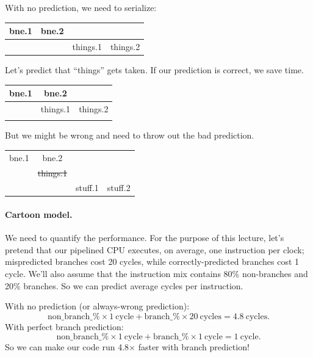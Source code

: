 \documentclass[a4paper]{report}
\begin{document}
With no prediction, we need to serialize:

\begin{center}
\begin{tabular}{c|c|c|c}
bne.1 & bne.2 \\ \hline
& & things.1 & things.2
\end{tabular}
\end{center}

\begin{minipage}{.49\textwidth}
Let's predict that ``things'' gets taken.
If our prediction is correct, we save time.

\begin{center}
\begin{tabular}{c|c|c}
bne.1 & bne.2 \\ \hline
& things.1 & things.2 \\
\\
\end{tabular}
\end{center}
\end{minipage} \hspace*{.02\textwidth} \begin{minipage}{.49\textwidth}
But we might be wrong and need to throw out the bad prediction.

\begin{center}
\begin{tabular}{c|c|c|c}
bne.1 & bne.2 \\ \cline{1-2}
& \sout{things.1} \\ \hline
& & stuff.1 & stuff.2
\end{tabular}
\end{center}
\end{minipage}

\paragraph{Cartoon model.} We need to quantify the performance.
For the purpose of this lecture, let's pretend that our pipelined
CPU executes, on average, one instruction per clock;
mispredicted branches cost 20 cycles, while correctly-predicted
branches cost 1 cycle. We'll also assume that the instruction
mix contains 80\% non-branches and 20\% branches. So we can predict
average cycles per instruction.

With no prediction (or always-wrong prediction):
\[
\mathrm{non\_branch\_\%} \times 1 \mathrm{~cycle} + \mathrm{branch\_\%} \times 20 \mathrm{~cycles} = 4.8 \mathrm{~cycles}.
\]
With perfect branch prediction:
\[
\mathrm{non\_branch\_\%} \times 1 \mathrm{~cycle} + \mathrm{branch\_\%} \times 1 \mathrm{~cycle} = 1 \mathrm{~cycle}.
\]
So we can make our code run 4.8$\times$ faster with branch prediction!
\end{document}
